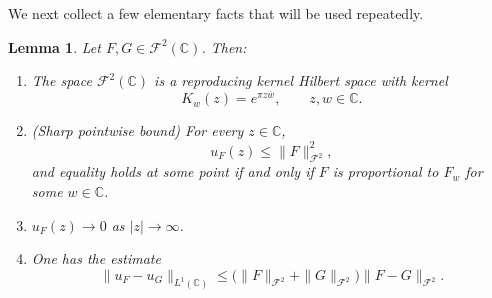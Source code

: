 \documentclass[a4paper,11pt,reqno]{amsart}
\numberwithin{equation}{section}
\theoremstyle{plain} %
\newtheorem{lemma}{Lemma}[section]
\theoremstyle{definition} %
\theoremstyle{remark}
\begin{document}
\medskip

We next collect a few elementary facts that will be used repeatedly.

\begin{lemma}\label{lem:Fock-basic}
Let $F,G \in \mathcal{F}^2(\mathbb{C})$. Then:
\begin{enumerate}
\item[(i)] The space $\mathcal{F}^2(\mathbb{C})$ is a reproducing kernel Hilbert space with kernel
\[
K_w(z) = e^{\pi z \overline{w}}, \qquad z,w \in \mathbb{C}.
\]

\item[(ii)] (Sharp pointwise bound) For every $z \in \mathbb{C}$,
\[
u_F(z) \le \|F\|_{\mathcal{F}^2}^2,
\]
and equality holds at some point if and only if $F$ is proportional to $F_w$
for some $w \in \mathbb{C}$.

\item[(iii)] $u_F(z) \to 0$ as $|z| \to \infty$.

\item[(iv)] One has the estimate
\[
\|u_F - u_G\|_{L^1(\mathbb{C})}
\le \big( \|F\|_{\mathcal{F}^2} + \|G\|_{\mathcal{F}^2} \big)
\|F - G\|_{\mathcal{F}^2}.
\]
\end{enumerate}
\end{lemma}
\end{document}
